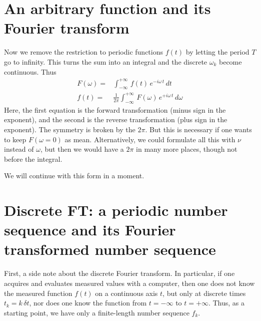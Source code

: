 \section{An arbitrary function and its Fourier transform}

Now we remove the restriction to periodic functions $f(t)$ by letting the period $T$ go to infinity. This turns the sum into an integral and the discrete $\omega_k$ become continuous. Thus
\begin{align}
 F(\omega) = & \int_{-\infty}^{+\infty} \, f(t) \, e^{- i \omega\, t} \, dt \\
 f(t) = & \frac{1}{2 \pi } \int_{-\infty}^{+\infty} \, F(\omega) \, e^{+ i \omega\, t} \, d\omega 
\end{align}
Here, the first equation is the forward transformation (minus sign in the exponent), and the second is the reverse transformation (plus sign in the exponent). The symmetry is broken by the $2 \pi$. But this is necessary if one wants to keep $F(\omega = 0)$ as mean. Alternatively, we could formulate all this with $\nu$ instead of $\omega$, but then we would have a $2 \pi$ in many more places, though not before the integral.

We will continue with this form in a moment.

\section{Discrete FT: a periodic number sequence and its Fourier transformed number sequence}

First, a side note about the discrete Fourier transform. In particular, if one acquires and evaluates measured values with a computer, then one does not know the measured function $f(t)$ on a continuous axis $t$, but only at discrete times $t_k = k \, \delta t$, nor does one know the function from $t = - \infty$ to $t = + \infty$. Thus, as a starting point, we have only a finite-length number sequence $f_k$.

